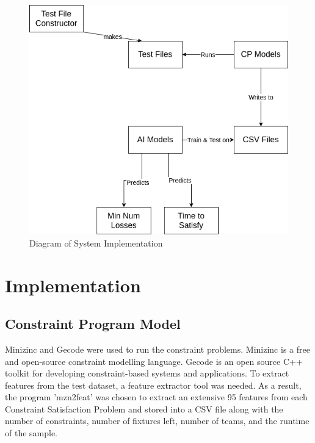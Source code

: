 \documentclass{article}
\begin{document}
	\begin{figure}[h]
		\includegraphics[width=\textwidth]{fyp_outline}
		\caption{Diagram of System Implementation}
	\end{figure}
	
	\newpage
	\section{Implementation}
	
	\subsection{Constraint Program Model}
	Minizinc and Gecode were used to run the constraint problems. Minizinc is a free and open-source constraint modelling language. Gecode is an open source C++ toolkit for developing constraint-based systems and applications.  To extract features from the test dataset, a feature extractor tool was needed. As a result, the program 'mzn2feat' was chosen to extract an extensive 95 features from each Constraint Satisfaction Problem and stored into a CSV file along with the number of constraints, number of fixtures left, number of teams, and the runtime of the sample.  
	
\end{document}

